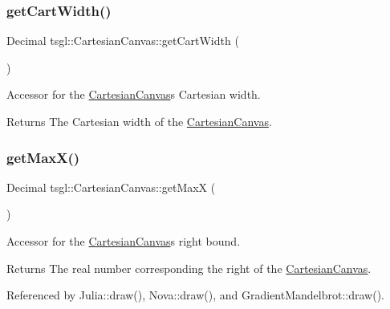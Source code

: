 \subsubsection{\texorpdfstring{get\+Cart\+Width()}{getCartWidth()}}
{\footnotesize\ttfamily Decimal tsgl\+::\+Cartesian\+Canvas\+::get\+Cart\+Width (\begin{DoxyParamCaption}{ }\end{DoxyParamCaption})\hspace{0.3cm}{\ttfamily [inline]}}



Accessor for the \hyperlink{classtsgl_1_1_cartesian_canvas}{Cartesian\+Canvas}\textquotesingle{}s Cartesian width. 

\begin{DoxyReturn}{Returns}
The Cartesian width of the \hyperlink{classtsgl_1_1_cartesian_canvas}{Cartesian\+Canvas}. 
\end{DoxyReturn}
\mbox{\label{classtsgl_1_1_cartesian_canvas_ae3cbac386f78ecff082b8c4cbd9081ed}} 
\subsubsection{\texorpdfstring{get\+Max\+X()}{getMaxX()}}
{\footnotesize\ttfamily Decimal tsgl\+::\+Cartesian\+Canvas\+::get\+MaxX (\begin{DoxyParamCaption}{ }\end{DoxyParamCaption})\hspace{0.3cm}{\ttfamily [inline]}}



Accessor for the \hyperlink{classtsgl_1_1_cartesian_canvas}{Cartesian\+Canvas}\textquotesingle{}s right bound. 

\begin{DoxyReturn}{Returns}
The real number corresponding the right of the \hyperlink{classtsgl_1_1_cartesian_canvas}{Cartesian\+Canvas}. 
\end{DoxyReturn}


Referenced by Julia\+::draw(), Nova\+::draw(), and Gradient\+Mandelbrot\+::draw().

\mbox{\label{classtsgl_1_1_cartesian_canvas_a68c0616f8180690423d39e9e83045b8c}} 

